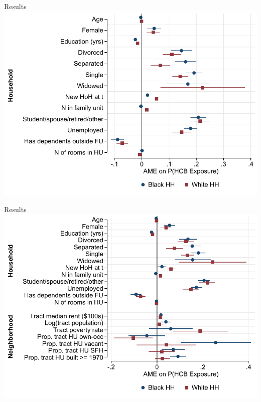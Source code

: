 \documentclass[10pt]{beamer}
\begin{document}
\begin{frame}{Results}
\vspace*{10pt}\includegraphics[width=\linewidth]{HCB_m2_ame_ropeladder.pdf}
\end{frame}

\begin{frame}{Results}
\vspace*{10pt}\includegraphics[width=\linewidth]{HCB_m3_ame_ropeladder.pdf}
\end{frame}
\end{document}
